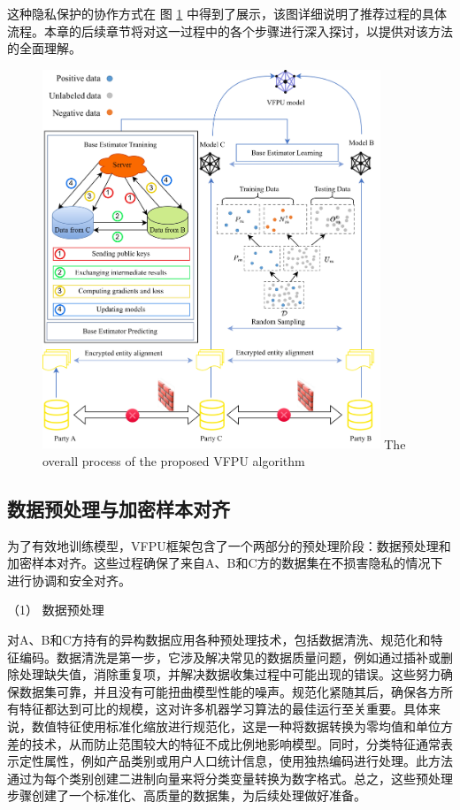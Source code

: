 这种隐私保护的协作方式在 图 \ref{fig:VFPU} 中得到了展示，该图详细说明了推荐过程的具体流程。本章的后续章节将对这一过程中的各个步骤进行深入探讨，以提供对该方法的全面理解。

\vspace{-0.1cm}
\begin{figure}[h]
	\centering
	\includegraphics[width=0.9\textwidth]{chapters/imgs/Figure 1 in JEPG format}
	{\wuhao The overall process of the proposed VFPU algorithm}
	\label{fig:VFPU}
\end{figure}
\vspace{-0.35cm}

\subsection{数据预处理与加密样本对齐}
为了有效地训练模型，VFPU框架包含了一个两部分的预处理阶段：数据预处理和加密样本对齐。这些过程确保了来自A、B和C方的数据集在不损害隐私的情况下进行协调和安全对齐。 

（1） 数据预处理 

对A、B和C方持有的异构数据应用各种预处理技术，包括数据清洗、规范化和特征编码。数据清洗是第一步，它涉及解决常见的数据质量问题，例如通过插补或删除处理缺失值，消除重复项，并解决数据收集过程中可能出现的错误。这些努力确保数据集可靠，并且没有可能扭曲模型性能的噪声。规范化紧随其后，确保各方所有特征都达到可比的规模，这对许多机器学习算法的最佳运行至关重要。具体来说，数值特征使用标准化缩放进行规范化，这是一种将数据转换为零均值和单位方差的技术，从而防止范围较大的特征不成比例地影响模型。同时，分类特征通常表示定性属性，例如产品类别或用户人口统计信息，使用独热编码进行处理。此方法通过为每个类别创建二进制向量来将分类变量转换为数字格式。总之，这些预处理步骤创建了一个标准化、高质量的数据集，为后续处理做好准备。

